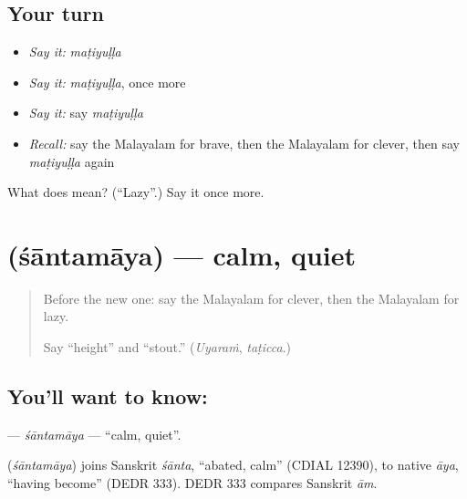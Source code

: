 \subsection*{Your turn}
\begin{itemize}
\raggedright
  \item \emph{Say it:} \emph{maṭiyuḷḷa}
  \item \emph{Say it:} \emph{maṭiyuḷḷa}, once more
  \item \emph{Say it:} say \emph{maṭiyuḷḷa}
  \item \emph{Recall:} say the Malayalam for brave, then the Malayalam for clever, then say \emph{maṭiyuḷḷa} again
\end{itemize}

\begin{tcolorbox}[breakable,colback=teal!4,colframe=teal!35!black,title={Before you move on}]
What does  mean? (\textquotedblleft{}Lazy\textquotedblright{}.) Say it once more.
\end{tcolorbox}
\section[\texorpdfstring{\ml{ശാന്തമായ} (śāntamāya)}{ശാന്തമായ (śāntamāya)}]{ (śāntamāya) — calm, quiet}

\label{lesson:ML-C169-santamaya}



\begin{quote}
Before the new one: say the Malayalam for clever, then the Malayalam for lazy.

Say \textquotedblleft{}height\textquotedblright{} and \textquotedblleft{}stout.\textquotedblright{} (\emph{Uyaraṁ}, \emph{taṭicca}.)
\end{quote}

\subsection*{You'll want to know: }
\textbf{} — \emph{śāntamāya} — \textquotedblleft{}calm, quiet\textquotedblright{}.

\begin{cousinweb}
\textbf{} (\emph{śāntamāya}) joins Sanskrit \emph{śānta}, \textquotedblleft{}abated, calm\textquotedblright{} (CDIAL 12390), to native \emph{āya}, \textquotedblleft{}having become\textquotedblright{} (DEDR 333). DEDR 333 compares Sanskrit \emph{ām}.
\end{cousinweb}

